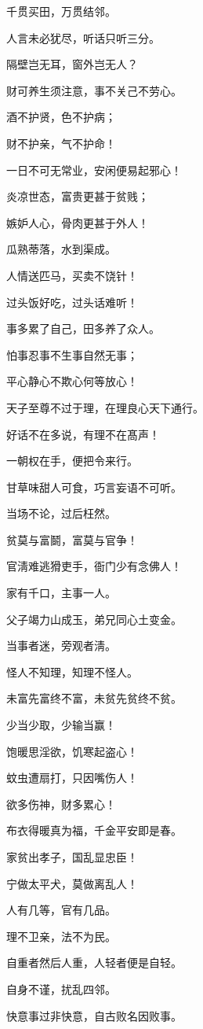 \documentclass[12pt,oneside]{book}
\begin{document}
千贯买田，万贯结邻。

人言未必犹尽，听话只听三分。

隔壁岂无耳，窗外岂无人？

财可养生须注意，事不关己不劳心。

酒不护贤，色不护病；

财不护亲，气不护命！

一日不可无常业，安闲便易起邪心！

炎凉世态，富贵更甚于贫贱；

嫉妒人心，骨肉更甚于外人！

瓜熟蒂落，水到渠成。

人情送匹马，买卖不饶针！

过头饭好吃，过头话难听！

事多累了自己，田多养了众人。

怕事忍事不生事自然无事；

平心静心不欺心何等放心！

天子至尊不过于理，在理良心天下通行。

好话不在多说，有理不在髙声！

一朝权在手，便把令来行。

甘草味甜人可食，巧言妄语不可听。

当场不论，过后枉然。

贫莫与富鬬，富莫与官争！

官淸难逃猾吏手，衙门少有念佛人！

家有千口，主事一人。

父子竭力山成玉，弟兄同心土变金。

当事者迷，旁观者淸。

怪人不知理，知理不怪人。

未富先富终不富，未贫先贫终不贫。

少当少取，少输当赢！

饱暖思淫欲，饥寒起盗心！

蚊虫遭扇打，只因嘴伤人！

欲多伤神，财多累心！

布衣得暖真为福，千金平安即是春。

家贫出孝子，国乱显忠臣！

宁做太平犬，莫做离乱人！

人有几等，官有几品。

理不卫亲，法不为民。

自重者然后人重，人轻者便是自轻。

自身不谨，扰乱四邻。

快意事过非快意，自古败名因败事。
\end{document}
